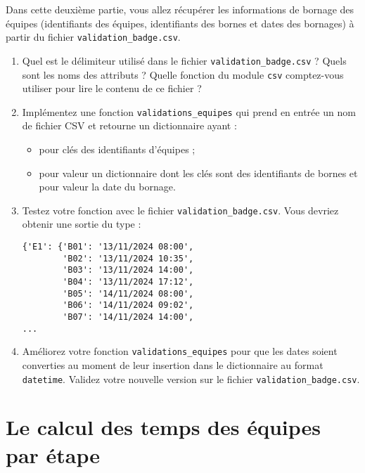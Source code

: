 \documentclass[11pt,a4paper]{article}
\begin{document}
Dans cette deuxième partie, vous allez récupérer les informations de bornage des équipes (identifiants des équipes, identifiants des bornes et dates des bornages) à partir du fichier \texttt{validation\_badge.csv}.

\begin{enumerate}
    \item Quel est le délimiteur utilisé dans le fichier \texttt{validation\_badge.csv} ? Quels sont les noms des attributs ? Quelle fonction du module \texttt{csv} comptez-vous utiliser pour lire le contenu de ce fichier ?
    \item Implémentez une fonction \texttt{validations\_equipes} qui prend en entrée un nom de fichier CSV et retourne un dictionnaire ayant :
    \begin{itemize}
        \item pour clés des identifiants d'équipes ;
        \item pour valeur un dictionnaire dont les clés sont des identifiants de bornes et pour valeur la date du bornage.
    \end{itemize}
    \item Testez votre fonction avec le fichier \texttt{validation\_badge.csv}. Vous devriez obtenir une sortie du type :
    \begin{verbatim}
{'E1': {'B01': '13/11/2024 08:00',
        'B02': '13/11/2024 10:35',
        'B03': '13/11/2024 14:00',
        'B04': '13/11/2024 17:12',
        'B05': '14/11/2024 08:00',
        'B06': '14/11/2024 09:02',
        'B07': '14/11/2024 14:00',
...
    \end{verbatim}
    \item Améliorez votre fonction \texttt{validations\_equipes} pour que les dates soient converties au moment de leur insertion dans le dictionnaire au format \texttt{datetime}. Validez votre nouvelle version sur le fichier \texttt{validation\_badge.csv}.
\end{enumerate}

\section{Le calcul des temps des équipes par étape}
\end{document}
